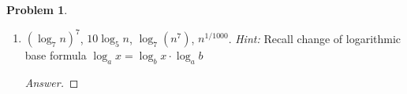 \documentclass[11pt]{article}
\theoremstyle{definition}
\theoremstyle{definition}
\newtheorem{required}{Problem}
\theoremstyle{definition}
\begin{document}
\begin{required}
\begin{enumerate} [label=(\alph*)]
\begin{proof}[Answer]
We do not know whether $f_2(n)$ or $f_4(n)$ grows faster than each other so we will compare the two functions to each other using L'hopital's rule: \\
\begin{align*}
\lim_{n \to \infty} \frac{n+1000000}{\frac{n^2}{\sqrt{n}}} &= \lim_{n \to \infty} \frac{n+1000000}{n^{3/2}}  = \frac{\infty}{\infty} \qquad Indeterminate  \\
&= \lim_{n \to \infty} \frac{1}{\frac{3}{2}n^{\frac{1}{2}}}  = \frac{1}{\infty}\\
&= 0.
\end{align*} 
We can see from the above that $f_4(n)$ will grow faster than $f_2(n)$, such that $f_2(n) \leq O(f_4(n))$. This shows that $f_4(n)$ will be an upper bound of $f_2(n)$. Thus, $f_4(n) \geq \Omega(f_2(n))$, which is the lower bound. \\

Out of our set of functions we see that:
\begin{center}
The functions that grows the fastest: $f_3(n)$ 
The function that grows the slowest: $f_2(n)$ 

\end{center}
\end{proof}

\newpage
\subsection{Problem 12\ref{1b}}
    \item \label{1b} $ (\log_7 n)^7 $, \qquad $10 \log_5 n$, \qquad $\log_7 (n^7)$, \qquad $n^{1/1000}$.
    \emph{Hint:} Recall change of logarithmic base formula $\log_a x = \log_b x\cdot\log_a b$
    \begin{proof}[Answer]

    \end{proof}
\end{enumerate}

\end{required}

\newpage
\end{document}
